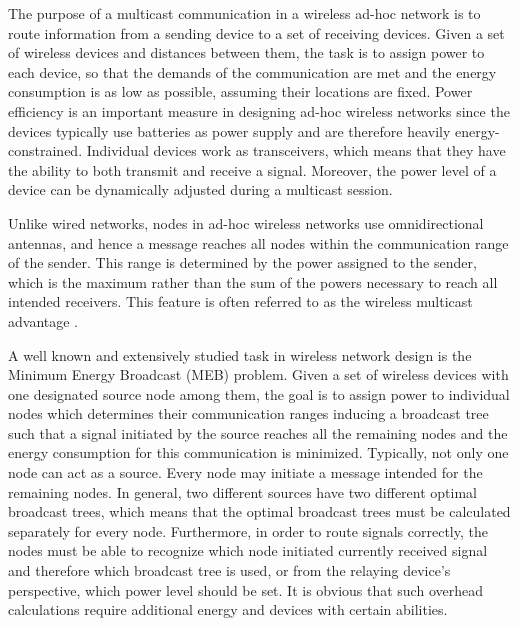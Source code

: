 \label{intro}

The purpose of a multicast communication in a wireless ad-hoc network is to route information from a sending device to a set of receiving devices. Given a set of wireless devices and distances between them, the task is to assign power to each device, so that the demands of the communication are met and the energy consumption is as low as possible, assuming their locations are fixed. Power efficiency is an important measure in designing ad-hoc wireless networks since the devices typically use batteries as power supply and are therefore heavily energy-constrained. Individual devices work as transceivers, which means that they have the ability to both transmit and receive a signal. Moreover, the power level of a device can be dynamically adjusted during a multicast session.

Unlike wired networks, nodes in ad-hoc wireless networks use omnidirectional antennas, and hence a message reaches all nodes within the communication range of the sender. This range is determined by the power assigned to the sender, which is the maximum rather than the sum of the powers necessary to reach all intended receivers. This feature is often referred to as the wireless multicast advantage \cite{Wieseltier00onthe}. 

A well known and extensively studied task in wireless network design is the Minimum Energy Broadcast (MEB) problem. Given a set of wireless devices with one designated source node among them, the goal is to assign power to individual nodes  which determines their communication ranges inducing a broadcast tree such that a signal initiated by the source reaches all the remaining nodes and the energy consumption for this communication is minimized. Typically, not only one node can act as a source. Every node may initiate a message intended for the remaining nodes. In general, two different sources have two different optimal broadcast trees, which means that the optimal broadcast trees must be calculated separately for every node. Furthermore, in order to route signals correctly, the nodes must be able to recognize which node initiated currently received signal and therefore which broadcast tree is used, or from the relaying device's perspective, which power level should be set. It is obvious that such overhead calculations require additional energy and devices with certain abilities.

